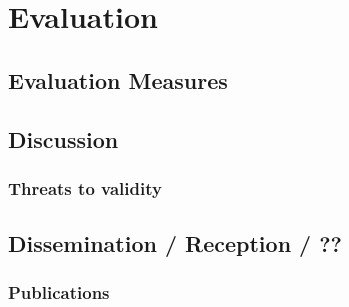 
\chapter{Evaluation}
\label{Evaluation}


\section{Evaluation Measures}








\section{Discussion}

\subsection{Threats to validity}



\section{Dissemination / Reception / ??}

\subsection{Publications}

